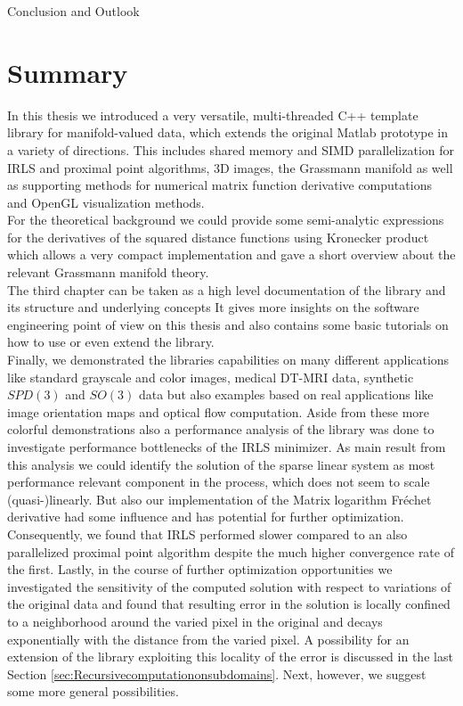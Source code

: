 \begin{chapter}{Conclusion and Outlook}
\label{ch:conclusion}

\section{Summary}
In this thesis we introduced a very versatile, multi-threaded C++ template library for manifold-valued data, which extends the original Matlab prototype in a variety of directions. This includes shared memory and SIMD parallelization for IRLS and 
proximal point algorithms, 3D images, 
the Grassmann manifold as well as supporting methods for numerical matrix function derivative computations and OpenGL visualization methods. \\

For the theoretical background we could provide some semi-analytic expressions for the derivatives of the squared
distance functions using Kronecker product which allows a very compact implementation and gave a short overview about the relevant Grassmann manifold theory.\\

The third chapter can be taken as a high level documentation of the library and its structure and underlying concepts It
gives more insights on the software engineering point of view on this thesis and also contains some basic tutorials on how to
use or even extend the library.\\

Finally, we demonstrated the libraries capabilities on many different applications like standard grayscale and color images,
medical DT-MRI data, synthetic $SPD(3)$ and $SO(3)$ data but also examples based on real applications like image orientation
maps and optical flow computation. Aside from these more colorful demonstrations also a performance analysis of the 
library was done to investigate performance bottlenecks of the IRLS minimizer. As main result from this analysis we
could identify the solution of the sparse linear system as most performance relevant component in the process, which
does not seem to scale (quasi-)linearly. But also our implementation of the Matrix logarithm Fr\'{e}chet derivative 
had some influence and has potential for further optimization.\\

Consequently, we found that IRLS performed slower compared to an also parallelized proximal point algorithm despite the much
higher convergence rate of the first. Lastly, in the course of further optimization opportunities we investigated the sensitivity
of the computed solution with respect to variations of the original data and found that resulting error in the solution is locally
confined to a neighborhood around the varied pixel in the original and decays exponentially with the distance from the varied pixel.
A possibility for an extension of the library exploiting this locality of the error is discussed in
the last Section \ref{sec:Recursivecomputationonsubdomains}. Next, however, we suggest some more general possibilities.


\end{chapter}
